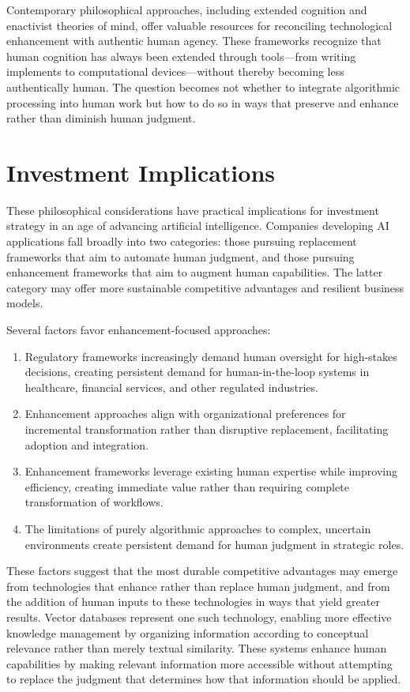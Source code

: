 \documentclass[
  Letterpaper,
]{scrbook}
\begin{document}
Contemporary philosophical approaches, including extended cognition and
enactivist theories of mind, offer valuable resources for reconciling
technological enhancement with authentic human agency. These frameworks
recognize that human cognition has always been extended through
tools---from writing implements to computational devices---without
thereby becoming less authentically human. The question becomes not
whether to integrate algorithmic processing into human work but how to
do so in ways that preserve and enhance rather than diminish human
judgment.

\section{Investment Implications}\label{investment-implications-2}

These philosophical considerations have practical implications for
investment strategy in an age of advancing artificial intelligence.
Companies developing AI applications fall broadly into two categories:
those pursuing replacement frameworks that aim to automate human
judgment, and those pursuing enhancement frameworks that aim to augment
human capabilities. The latter category may offer more sustainable
competitive advantages and resilient business models.

Several factors favor enhancement-focused approaches:

\begin{enumerate}
\def\labelenumi{\arabic{enumi}.}
\item
  Regulatory frameworks increasingly demand human oversight for
  high-stakes decisions, creating persistent demand for
  human-in-the-loop systems in healthcare, financial services, and other
  regulated industries.
\item
  Enhancement approaches align with organizational preferences for
  incremental transformation rather than disruptive replacement,
  facilitating adoption and integration.
\item
  Enhancement frameworks leverage existing human expertise while
  improving efficiency, creating immediate value rather than requiring
  complete transformation of workflows.
\item
  The limitations of purely algorithmic approaches to complex, uncertain
  environments create persistent demand for human judgment in strategic
  roles.
\end{enumerate}

These factors suggest that the most durable competitive advantages may
emerge from technologies that enhance rather than replace human
judgment, and from the addition of human inputs to these technologies in
ways that yield greater results. Vector databases represent one such
technology, enabling more effective knowledge management by organizing
information according to conceptual relevance rather than merely textual
similarity. These systems enhance human capabilities by making relevant
information more accessible without attempting to replace the judgment
that determines how that information should be applied.
\end{document}
